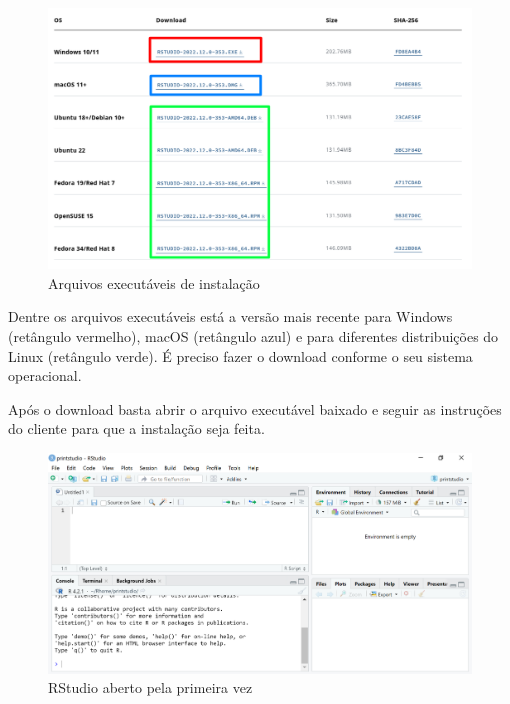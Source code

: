 \documentclass[
  letterpaper,
  DIV=11,
  numbers=noendperiod]{scrreprt}
\begin{document}
\begin{figure}

{\centering \includegraphics[width=1\textwidth,height=\textheight]{./figuras_tutorialR/install_Rstudio0.png}

}

\caption{Arquivos executáveis de instalação}

\end{figure}

Dentre os arquivos executáveis está a versão mais recente para Windows
(retângulo vermelho), macOS (retângulo azul) e para diferentes
distribuições do Linux (retângulo verde). É preciso fazer o download
conforme o seu sistema operacional.

Após o download basta abrir o arquivo executável baixado e seguir as
instruções do cliente para que a instalação seja feita.

\begin{figure}

{\centering \includegraphics[width=1\textwidth,height=\textheight]{./figuras_tutorialR/install_Rstudio1.png}

}

\caption{RStudio aberto pela primeira vez}

\end{figure}
\end{document}
